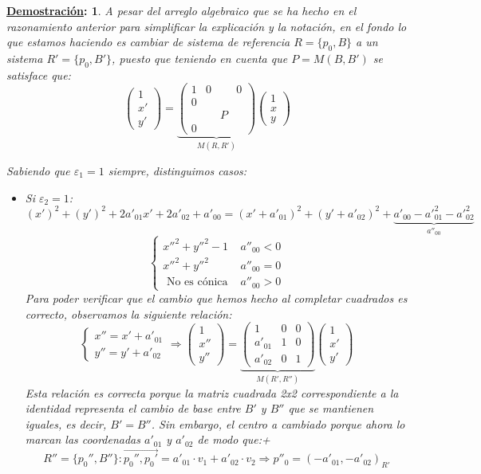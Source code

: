 \documentclass[10pt,a4paper,openright]{book}
\theoremstyle{break}
\newtheorem*{demo}{\underline{Demostración}:}
\begin{document}
\begin{demo}
A pesar del arreglo algebraico que se ha hecho en el razonamiento anterior para simplificar la explicación y la notación, en el fondo lo que estamos haciendo es cambiar de sistema de referencia $R=\{p_0, B\}$ a un sistema $R'=\{p_0, B'\}$, puesto que teniendo en cuenta que $P = M(B,B')$ se satisface que:
$$\begin{pmatrix} 1 \\ x' \\ y'\end{pmatrix} = \underbrace{\left(\begin{array}{c|ccc} 1 & 0 &  & 0 \\ \hline 0 &  &  &  \\  &  & P &  \\ 0 &  & & 
\end{array}\right)}_{M(R,R')} \begin{pmatrix} 1 \\ x \\ y \end{pmatrix}$$

Sabiendo que $\varepsilon_1 = 1$ siempre, distinguimos casos:
\begin{itemize}
\item Si $\varepsilon_2 = 1$:
$$(x')^2 + (y')^2 + 2 a'_{01} x' + 2  a'_{02} + a'_{00}= (x' + a'_{01} )^2 + (y' + a'_{02})^2 + \underbrace{a'_{00} - a'^2_{01} - a'^2_{02}}_{a''_{00}}$$
$$\begin{cases} x''^2 + y''^2 - 1 & a''_{00} < 0 \\ x''^2 + y''^2 & a''_{00} = 0 \\ \mbox{ No es cónica } & a''_{00} > 0 \end{cases}$$
Para poder verificar que el cambio que hemos hecho al completar cuadrados es correcto, observamos la siguiente relación:
$$\begin{cases}
x'' = x' + a'_{01} \\ y'' = y'  + a'_{02}
\end{cases} \Rightarrow \begin{pmatrix}
1 \\ x'' \\ y''
\end{pmatrix} =
\underbrace{\left(\begin{array}{c|cc}
1 & 0 & 0 \\
\hline
a'_{01} & 1  & 0  \\
a'_{02} &  0 &1 
\end{array}
\right)}_{M(R',R'')}
\begin{pmatrix}
1 \\ x' \\ y'
\end{pmatrix}$$
Esta relación es correcta porque la matriz cuadrada 2x2 correspondiente a la identidad representa el cambio de base entre $B'$ y $B''$ que se mantienen iguales, es decir, $B' = B''$. Sin embargo, el centro a cambiado porque ahora lo marcan las coordenadas $a'_{01}$ y $a'_{02}$ de modo que:+
$$R''=\{p_0'', B''\} : \vec{p_0'',p_0'} = a'_{01} \cdot v_1 + a'_{02} \cdot v_2 \Rightarrow p''_0 = (-a'_{01}, -a'_{02})_{R'}$$


\end{itemize}
\end{demo}
\end{document}
